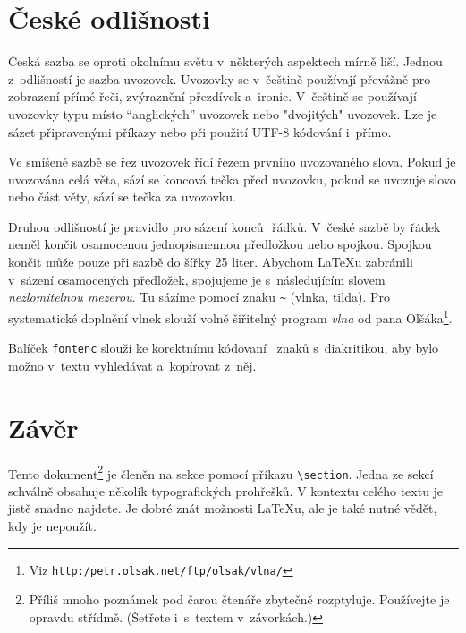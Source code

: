 \documentclass[czech,a4paper,10pt,twocolumn]{article}
\begin{document}
\section{České odlišnosti}

Česká sazba se oproti okolnímu světu v~některých aspektech mírně liší. Jednou z~odlišností je sazba uvozovek. Uvozovky se v~češtině používají převážně pro zobrazení přímé řeči, zvýraznění přezdívek a~ironie. V~češtině se používají uvozovky typu  místo ``anglických'' uvozovek nebo "dvojitých" uvozovek. Lze je sázet připravenými příkazy nebo při použití UTF-8 kódování i~přímo.

Ve smíšené sazbě se řez uvozovek řídí řezem prvního uvozovaného slova. Pokud je uvozována celá věta, sází se koncová tečka před uvozovku, pokud se uvozuje slovo nebo část věty, sází se tečka za uvozovku.

Druhou odlišností je pravidlo pro sázení konců\,\, řádků. V~české sazbě by řádek neměl končit osamocenou jednopísmennou předložkou nebo spojkou. Spojkou  končit může pouze při sazbě do šířky 25 liter. Abychom {\LaTeX}u zabránili v~sázení osamocených předložek, spojujeme je s~následujícím slovem \emph{nezlomitelnou mezerou}. Tu sázíme pomocí znaku \verb|~| (vlnka, tilda). Pro systematické doplnění vlnek slouží volně šiřitelný program \emph{vlna} od pana Olšáka\footnote{Viz \texttt{http:/petr.olsak.net/ftp/olsak/vlna/}}.

Balíček \texttt{fontenc} slouží ke korektnímu kódovaní\,\,\, znaků s~diakritikou, aby bylo možno v~textu vyhledávat a~kopírovat z~něj.

\section{Závěr}

Tento dokument\footnote{Příliš mnoho poznámek pod čarou čtenáře zbytečně rozptyluje. Používejte je opravdu střídmě. (Šetřete i~s~textem v~závorkách.)} je členěn na sekce pomocí příkazu \verb|\section|. Jedna ze sekcí schválně obsahuje několik typografických prohřešků. V kontextu celého textu je jistě snadno najdete. Je dobré znát možnosti {\LaTeX}u, ale je také nutné vědět, kdy je nepoužít.
\end{document}
